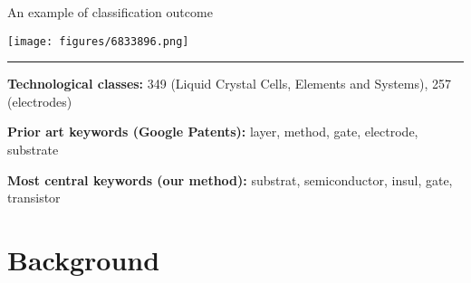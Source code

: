 \documentclass{beamer}
\begin{document}
\begin{frame}{An example of classification outcome}
    \begin{center}
	\texttt{[image: figures/6833896.png]}
	\end{center}
	
	\medskip
	\hrule
	
\medskip
	
	\textbf{Technological classes:} 349 (Liquid Crystal Cells, Elements and Systems), 257 (electrodes)
	
	\smallskip
	
	\textbf{Prior art keywords (Google Patents):} layer, method, gate, electrode, substrate
	
	\smallskip
	
	\textbf{Most central keywords (our method):} substrat, semiconductor, insul, gate, transistor
		
	
\end{frame}

	



\section{Background}

    
\end{document}
